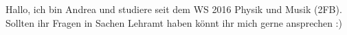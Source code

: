 \begin{multicols*}{2}
{Hallo, ich bin Andrea und studiere seit dem WS 2016 Physik und Musik (2FB). Sollten ihr Fragen in Sachen Lehramt haben könnt ihr mich gerne ansprechen :)
	\vspace{\baselineskip}
}


\end{multicols*}
